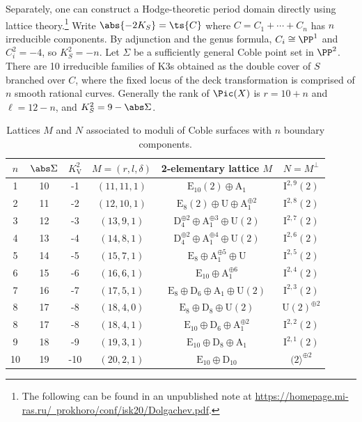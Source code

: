 \documentclass[../../main.tex]{subfiles}
\begin{document}
\begin{remark}
Separately, one can construct a Hodge-theoretic period domain directly using lattice theory.\footnote{
The following can be found in an unpublished note at \href{https://homepage.mi-ras.ru/~prokhoro/conf/isk20/Dolgachev.pdf}{https://homepage.mi-ras.ru/~prokhoro/conf/isk20/Dolgachev.pdf}.
}
Write $\abs{-2K_S} = \ts{C}$ where $C = C_1 + \cdots + C_n$ has $n$ irreducible components. By adjunction and the genus formula, $C_i\cong \PP^1$ and $C_i^2 = -4$, so $K_S^2 = -n$. Let $\Sigma$ be a sufficiently general Coble point set in $\PP^2$. There are 10 irreducible families of K3s obtained as the double cover of $S$ branched over $C$, where the fixed locus of the deck transformation is comprised of $n$ smooth rational curves. Generally the rank of $\Pic(X)$ is $r=10+n$ and $\ell = 12-n$, and $K_S^2 = 9-\abs\Sigma$.

\begin{table}[h!]
\centering
\begin{tabular}{|c|c|c|c|c|c|}
\hline$n$ & $\abs\Sigma$ & $K_{\mathrm{V}}^{2}$ & $M = (r, l, \delta)$ & 2-elementary lattice $M$ & $N=M^{\perp}$ \\
\hline 1 & 10 & -1 & $(11,11,1)$ & $\mathrm{E}_{10}(2) \oplus \mathrm{A}_{1}$ & $\mathrm{I}^{2,9}(2)$ \\
2 & 11 & -2 & $(12,10,1)$ & $\mathrm{E}_{8}(2) \oplus \mathrm{U} \oplus \mathrm{A}_1^{\oplus 2}$ & $\mathrm{I}^{2,8}(2)$ \\
3 & 12 & -3 & $(13,9,1)$ & $\mathrm{D}_{4}^{\oplus 2} \oplus \mathrm{A}_{1}^{\oplus 3} \oplus \mathrm{U}(2)$ & $\mathrm{I}^{2,7}(2)$ \\
4 & 13 & -4 & $(14,8,1)$ & $\mathrm{D}_{4}^{\oplus 2} \oplus \mathrm{A}_{1}^{\oplus 4} \oplus \mathrm{U}(2)$ & $\mathrm{I}^{2,6}(2)$ \\
5 & 14 & -5 & $(15,7,1)$ & $\mathrm{E}_{8} \oplus \mathrm{A}_{1}^{\oplus 5} \oplus \mathrm{U}$ & $\mathrm{I}^{2,5}(2)$ \\
6 & 15 & -6 & $(16,6,1)$ & $\mathrm{E}_{10} \oplus \mathrm{A}_{1}^{\oplus 6}$ & $\mathrm{I}^{2,4}(2)$ \\
7 & 16 & -7 & $(17,5,1)$ & $\mathrm{E}_{8} \oplus \mathrm{D}_{6} \oplus \mathrm{A}_{1} \oplus \mathrm{U}(2)$ & $\mathrm{I}^{2,3}(2)$ \\
8 & 17 & -8 & $(18,4,0)$ & $\mathrm{E}_{8} \oplus \mathrm{D}_{8} \oplus \mathrm{U}(2)$ & $\mathrm{U}(2)^{\oplus 2}$ \\
8 & 17 & -8 & $(18,4,1)$ & $\mathrm{E}_{10} \oplus \mathrm{D}_{6} \oplus \mathrm{A}_{1}^{\oplus 2}$ & $\mathrm{I}^{2,2}(2)$ \\
9 & 18 & -9 & $(19,3,1)$ & $\mathrm{E}_{10} \oplus \mathrm{D}_{8} \oplus \mathrm{A}_{1}$ & $\mathrm{I}^{2,1}(2)$ \\
10 & 19 & -10 & $(20,2,1)$ & $\mathrm{E}_{10} \oplus \mathrm{D}_{10}$ & $(2\rangle^{\oplus 2}$ \\
\hline
\end{tabular}
\label{table:coble-lattices}
\caption{Lattices $M$ and $N$ associated to moduli of Coble surfaces with $n$ boundary components.}
\end{table}


\end{remark}
\end{document}
